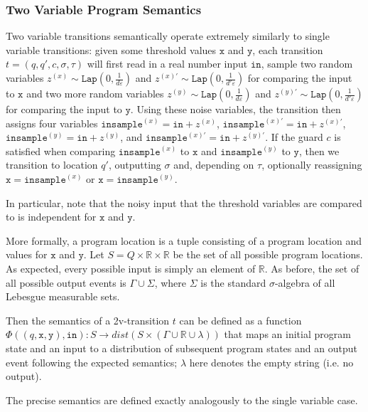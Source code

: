\documentclass[12pt]{article}
\newcommand{\RR}{\mathbb{R}}
\newcommand{\Lap}{\texttt{Lap}}
\theoremstyle{definition}
\begin{document}
\subsubsection{Two Variable Program Semantics}

Two variable transitions semantically operate extremely similarly to single variable transitions: given some threshold values $\texttt{x}$ and $\texttt{y}$, each transition $t = (q, q', c, \sigma, \tau)$ will first read in a real number input $\texttt{in}$, 
sample two random variables $z^{(x)}\sim\Lap(0, \frac{1}{d\varepsilon})$ and $z^{(x)\prime}\sim\Lap(0, \frac{1}{d'\varepsilon})$ for comparing the input to $\texttt{x}$ and two more random variables $z^{(y)}\sim\Lap(0, \frac{1}{d\varepsilon})$ and $z^{(y)\prime}\sim\Lap(0, \frac{1}{d'\varepsilon})$ for comparing the input to $\texttt{y}$.
Using these noise variables, the transition then assigns four variables $\texttt{insample}^{(x)} = \texttt{in} + z^{(x)}$, $\texttt{insample}^{(x)\prime} = \texttt{in} + z^{(x)\prime}$, $\texttt{insample}^{(y)} = \texttt{in} + z^{(y)}$, and $\texttt{insample}^{(x)\prime} = \texttt{in} + z^{(y)\prime}$. 
If the guard $c$ is satisfied when comparing $\texttt{insample}^{(x)}$ to $\texttt{x}$ and $\texttt{insample}^{(y)}$ to $\texttt{y}$, then we transition to location $q'$, outputting $\sigma$ and, depending on $\tau$, optionally reassigning $\texttt{x} = \texttt{insample}^{(x)}$ or $\texttt{x} = \texttt{insample}^{(y)}$.

In particular, note that the noisy input that the threshold variables are compared to is independent for $\texttt{x}$ and $\texttt{y}$.

More formally, a program location is a tuple consisting of a program location and values for $\texttt{x}$ and $\texttt{y}$. Let $S = Q\times\RR\times \RR$ be the set of all possible program locations. As expected, every possible input is simply an element of $\RR$. 
As before, the set of all possible output events is $\Gamma \cup \Sigma$, where $\Sigma$ is the standard $\sigma$-algebra of all Lebesgue measurable sets. 

Then the semantics of a 2v-transition $t$ can be defined as a function $\Phi((q, \texttt{x}, \texttt{y}), \texttt{in}): S\to dist(S\times (\Gamma\cup\RR\cup \lambda))$ that maps an initial program state and an input to a distribution of subsequent program states and an output event following the expected semantics; $\lambda$ here denotes the empty string (i.e. no output). 

The precise semantics are defined exactly analogously to the single variable case. 
\end{document}
